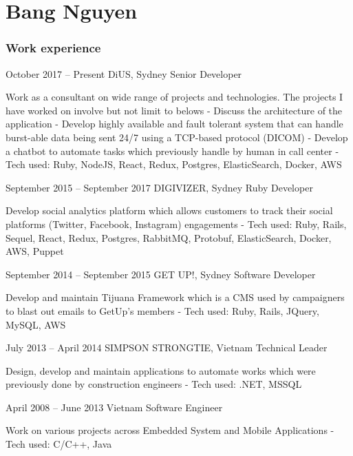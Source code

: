 \documentclass{tccv}
\begin{document}
\part{Bang Nguyen}

\section{Work experience}

\begin{eventlist}

\item{October 2017 -- Present}
    {DiUS, Sydney}
    {Senior Developer}

    Work as a consultant on wide range of projects and technologies. The projects
    I have worked on involve but not limit to belows
    \newline- Discuss the architecture of the application
    \newline- Develop highly available and fault tolerant system that can handle
    burst-able data being sent 24/7 using a TCP-based protocol (DICOM)
    \newline- Develop a chatbot to automate tasks which previously handle by
    human in call center
    \newline- Tech used: Ruby, NodeJS, React, Redux, Postgres, ElasticSearch,
    Docker, AWS

\item{September 2015 -- September 2017}
    {DIGIVIZER, Sydney}
    {Ruby Developer}

    Develop social analytics platform which allows customers to track their
    social platforms (Twitter, Facebook, Instagram) engagements
    \newline- Tech used: Ruby, Rails, Sequel, React, Redux, Postgres, RabbitMQ,
    Protobuf, ElasticSearch, Docker, AWS, Puppet

\item{September 2014 -- September 2015}
    {GET UP!, Sydney}
    {Software Developer}

    Develop and maintain Tijuana Framework which is a CMS
    used by campaigners to blast out emails to GetUp's members
    \newline- Tech used: Ruby, Rails, JQuery, MySQL, AWS

\item{July 2013 -- April 2014}
    {SIMPSON STRONGTIE, Vietnam}
    {Technical Leader}

    Design, develop and maintain applications to automate works which were
    previously done by construction engineers
    \newline- Tech used: .NET, MSSQL

\item{April 2008 -- June 2013}
    {Vietnam}
    {Software Engineer}

    Work on various projects across Embedded System and Mobile Applications
    \newline- Tech used: C/C++, Java

\end{eventlist}
\end{document}
